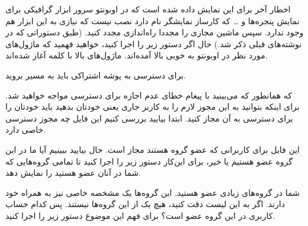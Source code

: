 اخطار آخر برای این نمایش داده شده است که در اوبونتو سرور ابزار گرافیکی برای نمایش پنجره‌ها و … که کارساز  نمایشگر 
  نام دارد نصب نیست که نیازی به این ابزار هم وجود ندارد. سپس ماشین مجازی را مجددا راه‌اندازی مجدد کنید. (طبق دستوراتی که در نوشته‌های قبلی ذکر شد.) حال اگر دستور زیر را اجرا کنید، خواهید فهمید که ماژول‌های مورد نظر در اوبونتو به خوبی بالا آمده‌اند. ماژول‌های بالا با کلمه 
   آغاز شده‌اند.
\newline
\begin{latin}
    
\end{latin}
برای دسترسی به پوشه اشتراکی باید به مسیر 
 بروید.
 
\begin{latin}
    
\end{latin}
که همانطور که می‌بینید با پیغام خطای عدم اجازه برای دسترسی مواجه خواهید شد. برای اینکه بتوانید به این  مجوز لازم را به کاربر جاری یعنی خودتان بدهید باید خودتان را برای دسترسی به آن مجاز کنید. ابتدا بیایید بررسی کنیم این فایل چه مجوز دسترسی خاصی دارد.

\begin{latin}
    
\end{latin}
این فایل برای کاربرانی که عضو گروه 
 هستند مجاز است. حال بیایید ببینیم آیا ما در این گروه عضو هستیم یا خیر، برای این‌کار دستور زیر را اجرا کنید تا تمامی گروه‌هایی که شما در آنان عضو هستید را نمایش دهد.


\begin{latin}
    
\end{latin}
شما در گروه‌های زیادی عضو هستید. این گروه‌ها یک مشخصه خاصی نیز به همراه خود دارند. اگر به این لیست دقت کنید، هیچ یک از این گروه‌ها 
 نیستند. پس کدام حساب کاربری در این گروه عضو است؟ برای فهم این موضوع دستور زیر را اجرا کنید.

\begin{latin}
    
\end{latin}

